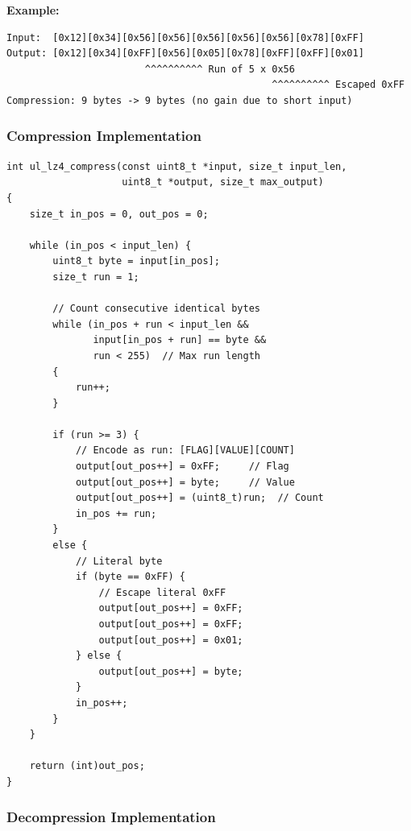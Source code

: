 \documentclass[11pt,a4paper]{article}
\begin{document}
\textbf{Example:}
\begin{lstlisting}[language={}]
Input:  [0x12][0x34][0x56][0x56][0x56][0x56][0x56][0x78][0xFF]
Output: [0x12][0x34][0xFF][0x56][0x05][0x78][0xFF][0xFF][0x01]
                        ^^^^^^^^^^ Run of 5 x 0x56
                                              ^^^^^^^^^^ Escaped 0xFF
Compression: 9 bytes -> 9 bytes (no gain due to short input)
\end{lstlisting}

\subsubsection{Compression Implementation}

\begin{lstlisting}[caption={RLE Compression (ul\_lz4\_compress)}]
int ul_lz4_compress(const uint8_t *input, size_t input_len,
                    uint8_t *output, size_t max_output)
{
    size_t in_pos = 0, out_pos = 0;

    while (in_pos < input_len) {
        uint8_t byte = input[in_pos];
        size_t run = 1;

        // Count consecutive identical bytes
        while (in_pos + run < input_len &&
               input[in_pos + run] == byte &&
               run < 255)  // Max run length
        {
            run++;
        }

        if (run >= 3) {
            // Encode as run: [FLAG][VALUE][COUNT]
            output[out_pos++] = 0xFF;     // Flag
            output[out_pos++] = byte;     // Value
            output[out_pos++] = (uint8_t)run;  // Count
            in_pos += run;
        }
        else {
            // Literal byte
            if (byte == 0xFF) {
                // Escape literal 0xFF
                output[out_pos++] = 0xFF;
                output[out_pos++] = 0xFF;
                output[out_pos++] = 0x01;
            } else {
                output[out_pos++] = byte;
            }
            in_pos++;
        }
    }

    return (int)out_pos;
}
\end{lstlisting}

\subsubsection{Decompression Implementation}
\end{document}

